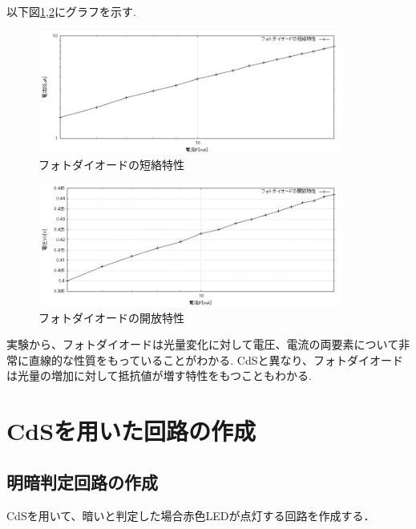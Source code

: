 \documentclass[titlepage]{jarticle}
\begin{document}
\newpage

以下図\ref{fig:フォトダイオードの短絡特性},\ref{fig:フォトダイオードの開放特性}にグラフを示す.
\begin{figure}[H]
    \begin{center}
        \includegraphics[width=10cm]{graph/2.PNG}
        \caption{フォトダイオードの短絡特性}
        \label{fig:フォトダイオードの短絡特性}
    \end{center}
\end{figure}

\begin{figure}[H]
    \begin{center}
        \includegraphics[width=10cm]{graph/3.PNG}
        \caption{フォトダイオードの開放特性}
        \label{fig:フォトダイオードの開放特性}
    \end{center}
\end{figure}

実験から、フォトダイオードは光量変化に対して電圧、電流の両要素について非常に直線的な性質をもっていることがわかる.
CdSと異なり、フォトダイオードは光量の増加に対して抵抗値が増す特性をもつこともわかる.

\section{CdSを用いた回路の作成}
\subsection{明暗判定回路の作成}
CdSを用いて、暗いと判定した場合赤色LEDが点灯する回路を作成する．
\end{document}
